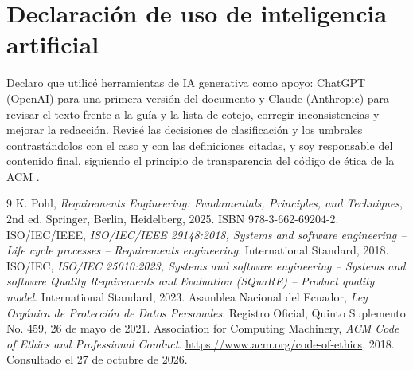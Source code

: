 \documentclass[11pt,a4paper]{article}
\begin{document}
\section{Declaración de uso de inteligencia artificial}
Declaro que utilicé herramientas de IA generativa como apoyo: ChatGPT (OpenAI) para una primera versión del documento y Claude (Anthropic) para revisar el texto frente a la guía y la lista de cotejo, corregir inconsistencias y mejorar la redacción. Revisé las decisiones de clasificación y los umbrales contrastándolos con el caso y con las definiciones citadas, y soy responsable del contenido final, siguiendo el principio de transparencia del código de ética de la ACM \cite{acm}.

\begin{thebibliography}{9}
 K. Pohl, \textit{Requirements Engineering: Fundamentals, Principles, and Techniques}, 2nd ed. Springer, Berlin, Heidelberg, 2025. ISBN 978-3-662-69204-2.
 ISO/IEC/IEEE, \textit{ISO/IEC/IEEE 29148:2018, Systems and software engineering -- Life cycle processes -- Requirements engineering}. International Standard, 2018.
 ISO/IEC, \textit{ISO/IEC 25010:2023, Systems and software engineering -- Systems and software Quality Requirements and Evaluation (SQuaRE) -- Product quality model}. International Standard, 2023.
 Asamblea Nacional del Ecuador, \textit{Ley Orgánica de Protección de Datos Personales}. Registro Oficial, Quinto Suplemento No. 459, 26 de mayo de 2021.
 Association for Computing Machinery, \textit{ACM Code of Ethics and Professional Conduct}. \url{https://www.acm.org/code-of-ethics}, 2018. Consultado el 27 de octubre de 2026.
\end{thebibliography}
\end{document}
